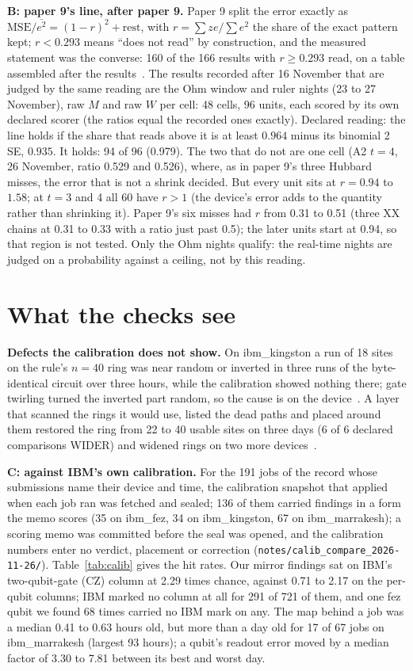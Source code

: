\documentclass[10pt,a4paper]{article}
\begin{document}
\textbf{B: paper 9's line, after paper 9.} Paper 9 split the error exactly as $\mathrm{MSE}/\overline{e^2} = (1-r)^2 +
\text{rest}$, with $r = \sum ze/\sum e^2$ the share of the exact pattern kept; $r < 0.293$ means ``does not read'' by
construction, and the measured statement was the converse: 160 of the 166 results with $r \ge 0.293$ read, on a table
assembled after the results~\cite{p9}. The results recorded after 16 November that are judged by the same reading are
the Ohm window and ruler nights (23 to 27 November), raw $M$ and raw $W$ per cell: 48 cells, 96 units, each scored by
its own declared scorer (the ratios equal the recorded ones exactly). Declared reading: the line holds if the share that
reads above it is at least $0.964$ minus its binomial 2 SE, $0.935$. It holds: 94 of 96 (0.979). The two that do not
are one cell (A2 $t = 4$, 26 November, ratio 0.529 and 0.526), where, as in paper 9's three Hubbard misses, the error
that is not a shrink decided. But every unit sits at $r = 0.94$ to $1.58$; at $t = 3$ and 4 all 60 have $r > 1$ (the device's error
adds to the quantity rather than shrinking it). Paper 9's six misses had $r$ from 0.31 to 0.51 (three XX chains at 0.31 to 0.33 with a ratio just past
0.5); the later units start at 0.94, so that region is not tested. Only the Ohm nights qualify: the real-time nights
are judged on a probability against a ceiling, not by this reading.

\section{What the checks see}\label{sec:checks}
\textbf{Defects the calibration does not show.} On ibm\_kingston a run of 18 sites on the rule's $n = 40$ ring was near
random or inverted in three runs of the byte-identical circuit over three hours, while the calibration showed nothing
there; gate twirling turned the inverted part random, so the cause is on the device~\cite{p5}. A layer that scanned the
rings it would use, listed the dead paths and placed around them restored the ring from 22 to 40 usable sites on three
days (6 of 6 declared comparisons WIDER) and widened rings on two more devices~\cite{p6}.

\textbf{C: against IBM's own calibration.} For the 191 jobs of the record whose submissions name their device and
time, the calibration snapshot that applied when each job ran was fetched and sealed; 136 of them carried findings in a
form the memo scores (35 on ibm\_fez, 34 on ibm\_kingston, 67 on ibm\_marrakesh); a scoring memo was committed before the seal was opened, and the calibration
numbers enter no verdict, placement or correction (\texttt{notes/calib\_compare\_2026-11-26/}). Table~\ref{tab:calib}
gives the hit rates. Our mirror findings sat on IBM's two-qubit-gate (CZ) column at 2.29 times chance, against 0.71 to
2.17 on the per-qubit columns; IBM marked no column at all for 291 of 721 of them, and one fez qubit we found 68 times
carried no IBM mark on any. The map behind a job was a median 0.41 to 0.63 hours old, but more than a day old for 17
of 67 jobs on ibm\_marrakesh (largest 93 hours); a qubit's readout error moved by a median factor of 3.30 to 7.81
between its best and worst day.
\end{document}
